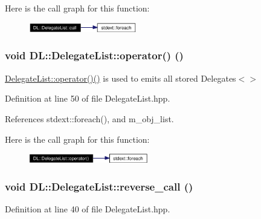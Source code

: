 Here is the call graph for this function:\begin{figure}[H]
\begin{center}
\leavevmode
\includegraphics[width=133pt]{classDL_1_1DelegateList_a3_cgraph}
\end{center}
\end{figure}
\hypertarget{classDL_1_1DelegateList_a4}{
\subsubsection[operator()]{\setlength{\rightskip}{0pt plus 5cm}void DL::Delegate\-List::operator() ()}}
\label{classDL_1_1DelegateList_a4}


\hyperlink{classDL_1_1DelegateList_a4}{Delegate\-List::operator()()} is used to emits all stored Delegates$<$$>$

Definition at line 50 of file Delegate\-List.hpp.

References stdext::foreach(), and m\_\-obj\_\-list.

Here is the call graph for this function:\begin{figure}[H]
\begin{center}
\leavevmode
\includegraphics[width=147pt]{classDL_1_1DelegateList_a4_cgraph}
\end{center}
\end{figure}
\hypertarget{classDL_1_1DelegateList_a2}{
\subsubsection[reverse\_\-call]{\setlength{\rightskip}{0pt plus 5cm}void DL::Delegate\-List::reverse\_\-call ()}}
\label{classDL_1_1DelegateList_a2}




Definition at line 40 of file Delegate\-List.hpp.

